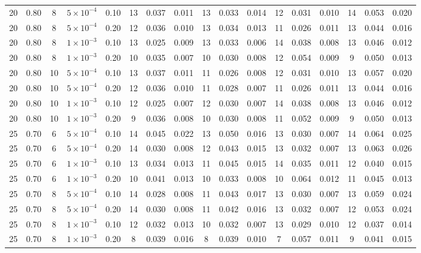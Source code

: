 \begin{longtable}{c c c c c c c c c c c c c c c c c }
20 & 0.80 & 8 & $5{\times}10^{-4}$ & 0.10 & 13 & 0.037 & 0.011 & 13 & 0.033 & 0.014 & 12 & 0.031 & 0.010 & 14 & 0.053 & 0.020 \\
20 & 0.80 & 8 & $5{\times}10^{-4}$ & 0.20 & 12 & 0.036 & 0.010 & 13 & 0.034 & 0.013 & 11 & 0.026 & 0.011 & 13 & 0.044 & 0.016 \\
20 & 0.80 & 8 & $1{\times}10^{-3}$ & 0.10 & 13 & 0.025 & 0.009 & 13 & 0.033 & 0.006 & 14 & 0.038 & 0.008 & 13 & 0.046 & 0.012 \\
20 & 0.80 & 8 & $1{\times}10^{-3}$ & 0.20 & 10 & 0.035 & 0.007 & 10 & 0.030 & 0.008 & 12 & 0.054 & 0.009 & 9 & 0.050 & 0.013 \\
20 & 0.80 & 10 & $5{\times}10^{-4}$ & 0.10 & 13 & 0.037 & 0.011 & 11 & 0.026 & 0.008 & 12 & 0.031 & 0.010 & 13 & 0.057 & 0.020 \\
20 & 0.80 & 10 & $5{\times}10^{-4}$ & 0.20 & 12 & 0.036 & 0.010 & 11 & 0.028 & 0.007 & 11 & 0.026 & 0.011 & 13 & 0.044 & 0.016 \\
20 & 0.80 & 10 & $1{\times}10^{-3}$ & 0.10 & 12 & 0.025 & 0.007 & 12 & 0.030 & 0.007 & 14 & 0.038 & 0.008 & 13 & 0.046 & 0.012 \\
20 & 0.80 & 10 & $1{\times}10^{-3}$ & 0.20 & 9 & 0.036 & 0.008 & 10 & 0.030 & 0.008 & 11 & 0.052 & 0.009 & 9 & 0.050 & 0.013 \\
\midrule
25 & 0.70 & 6 & $5{\times}10^{-4}$ & 0.10 & 14 & 0.045 & 0.022 & 13 & 0.050 & 0.016 & 13 & 0.030 & 0.007 & 14 & 0.064 & 0.025 \\
25 & 0.70 & 6 & $5{\times}10^{-4}$ & 0.20 & 14 & 0.030 & 0.008 & 12 & 0.043 & 0.015 & 13 & 0.032 & 0.007 & 13 & 0.063 & 0.026 \\
25 & 0.70 & 6 & $1{\times}10^{-3}$ & 0.10 & 13 & 0.034 & 0.013 & 11 & 0.045 & 0.015 & 14 & 0.035 & 0.011 & 12 & 0.040 & 0.015 \\
25 & 0.70 & 6 & $1{\times}10^{-3}$ & 0.20 & 10 & 0.041 & 0.013 & 10 & 0.033 & 0.008 & 10 & 0.064 & 0.012 & 11 & 0.045 & 0.013 \\
25 & 0.70 & 8 & $5{\times}10^{-4}$ & 0.10 & 14 & 0.028 & 0.008 & 11 & 0.043 & 0.017 & 13 & 0.030 & 0.007 & 13 & 0.059 & 0.024 \\
25 & 0.70 & 8 & $5{\times}10^{-4}$ & 0.20 & 14 & 0.030 & 0.008 & 11 & 0.042 & 0.016 & 13 & 0.032 & 0.007 & 12 & 0.053 & 0.024 \\
25 & 0.70 & 8 & $1{\times}10^{-3}$ & 0.10 & 12 & 0.032 & 0.013 & 10 & 0.032 & 0.007 & 13 & 0.029 & 0.010 & 12 & 0.037 & 0.014 \\
25 & 0.70 & 8 & $1{\times}10^{-3}$ & 0.20 & 8 & 0.039 & 0.016 & 8 & 0.039 & 0.010 & 7 & 0.057 & 0.011 & 9 & 0.041 & 0.015 \\

\end{longtable}
